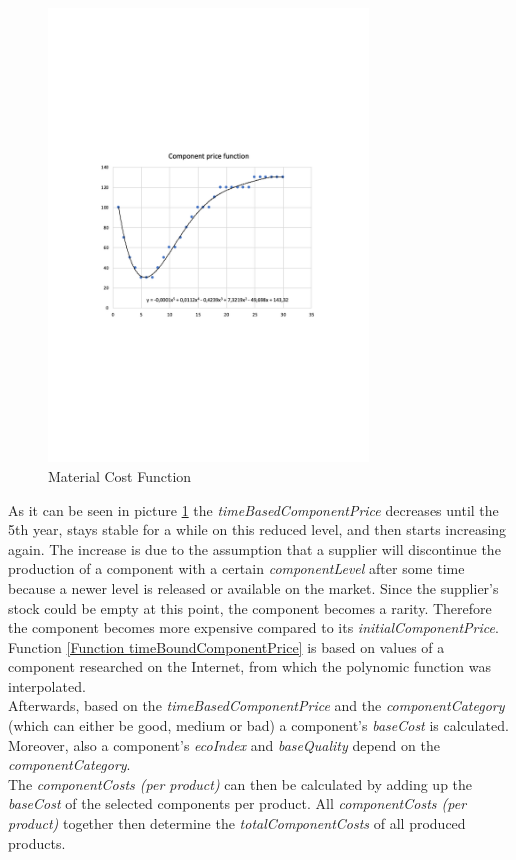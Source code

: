 \begin{figure}[!htbp]
	\centering
	\includegraphics[width=8.5cm]{images/materialCostFunction.pdf}
	\caption{Material Cost Function}
	\label{img:materialCostFunction}
\end{figure}

As it can be seen in picture \ref{img:materialCostFunction} the \textit{timeBasedComponentPrice} decreases until the 5th year, stays stable for a while on this reduced level, and then starts increasing again. The increase is due to the assumption that a supplier will discontinue the production of a component with a certain \textit{componentLevel} after some time because a newer level is released or available on the market. Since the supplier’s stock could be empty at this point, the component becomes a rarity. Therefore the component becomes more expensive compared to its \textit{initialComponentPrice}. Function \ref{Function timeBoundComponentPrice} is based on values of a component researched on the Internet, from which the polynomic function was interpolated.\\
Afterwards, based on the \textit{timeBasedComponentPrice} and the \textit{componentCategory} (which can either be good, medium or bad) a component's \textit{baseCost} is calculated. Moreover, also a component's \textit{ecoIndex} and \textit{baseQuality} depend on the \textit{componentCategory}.\\
The \textit{componentCosts (per product)} can then be calculated by adding up the \textit{baseCost} of the selected components per product. All \textit{componentCosts (per product)} together then determine the \textit{totalComponentCosts} of all produced products.\\

